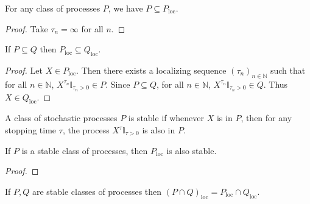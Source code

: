 \begin{lemma}\label{lem:implies_locally}
  \mathlibok
For any class of processes $P$, we have $P \subseteq P_{\mathrm{loc}}$.
\end{lemma}

\begin{proof}\leanok
Take $\tau_n = \infty$ for all $n$.
\end{proof}


\begin{lemma}\label{lem:locally_mono}
  \mathlibok
If $P \subseteq Q$ then $P_{\mathrm{loc}} \subseteq Q_{\mathrm{loc}}$.
\end{lemma}

\begin{proof}\leanok
Let $X \in P_{\mathrm{loc}}$.
Then there exists a localizing sequence $(\tau_n)_{n \in \mathbb{N}}$ such that for all $n \in \mathbb{N}$, $X^{\tau_n}\mathbb{I}_{\tau_n > 0} \in P$.
Since $P \subseteq Q$, for all $n \in \mathbb{N}$, $X^{\tau_n}\mathbb{I}_{\tau_n > 0} \in Q$.
Thus $X \in Q_{\mathrm{loc}}$.
\end{proof}


\begin{definition}\label{def:stable}
  \mathlibok
A class of stochastic processes $P$ is stable if whenever $X$ is in $P$, then for any stopping time $\tau$, the process $X^{\tau}\mathbb{I}_{\tau > 0}$ is also in $P$.
\end{definition}


\begin{lemma}\label{lem:isStable_locally}
  \mathlibok
If $P$ is a stable class of processes, then $P_{\mathrm{loc}}$ is also stable.
\end{lemma}

\begin{proof}\leanok

\end{proof}


\begin{lemma}\label{lem:locally_inter}
  \mathlibok
If $P, Q$ are stable classes of processes then $(P\cap Q)_{\mathrm{loc}} = P_{\mathrm{loc}}\cap Q_{\mathrm{loc}}$.
\end{lemma}

